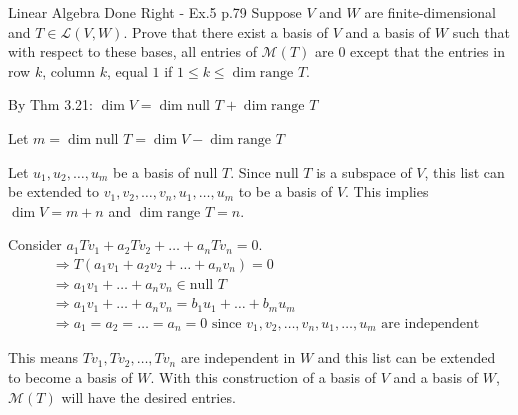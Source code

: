 \begin{problem}{}{}{Linear Algebra Done Right - Ex.5 p.79}
Suppose $V$ and $W$ are finite-dimensional and $T \in \mathcal{L}(V, W)$. Prove that there
exist a basis of $V$ and a basis of $W$ such that with respect to these bases, all
entries of $\mathcal{M}(T)$ are $0$ except that the entries in row $k$, column $k$, equal $1$ if
$1 \leq k \leq \dim \text{range } T$.
\end{problem}

\begin{solution}
By Thm 3.21: $\dim V = \dim \text{null } T + \dim \text{range } T$

Let $m = \dim \text{null } T = \dim V - \dim \text{range } T$

Let $u_1, u_2, \dots, u_m$ be a basis of $\text{null } T$. 
Since $\text{null } T$ is a subspace of $V$, this list can be 
extended to $v_1, v_2, \dots, v_n, u_1, \dots, u_m$ to be a basis of $V$. 
This implies $\dim V = m + n$ and $\dim \text{range } T = n$.

Consider $a_1 T v_1 + a_2 T v_2 + \dots + a_n T v_n = 0$.
\begin{align*}
    &\Rightarrow T(a_1 v_1 + a_2 v_2 + \dots + a_n v_n) = 0 \\
    &\Rightarrow a_1 v_1 + \dots + a_n v_n \in \text{null } T \\
    &\Rightarrow a_1 v_1 + \dots + a_n v_n = b_1 u_1 + \dots + b_m u_m \\
    &\Rightarrow a_1 = a_2 = \dots = a_n = 0 \text{ since } v_1, v_2, \dots, v_n, u_1, \dots, u_m \text{ are independent}
\end{align*}

This means $T v_1, T v_2, \dots, T v_n$ are independent in $W$ and 
this list can be extended to become a basis of $W$. 
With this construction of a basis of $V$ and a basis of $W$, 
$\mathcal{M}(T)$ will have the desired entries.
\end{solution}
